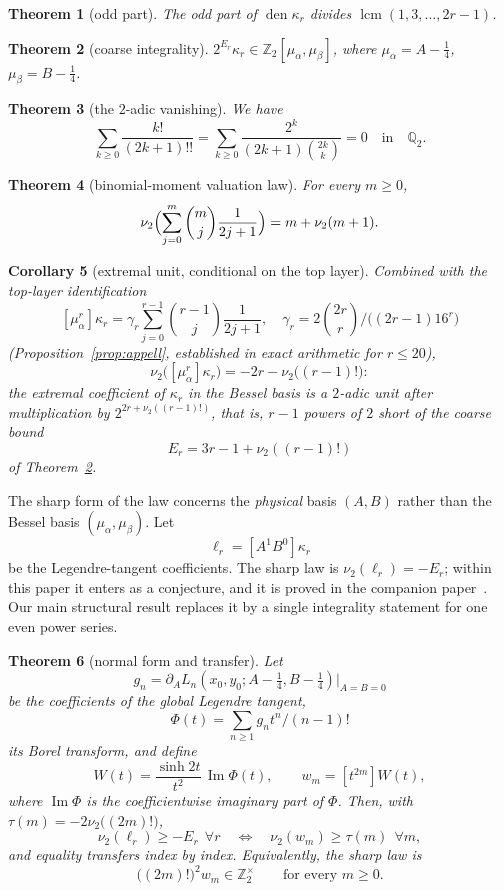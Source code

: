 \documentclass[12pt]{amsart}
\newtheorem{theorem}{Theorem}[section]
\newtheorem{corollary}[theorem]{Corollary}
\theoremstyle{definition}
\theoremstyle{remark}
\DeclareMathOperator{\den}{den}
\newcommand{\Zt}{\mathbb Z_2}
\newcommand{\Qt}{\mathbb Q_2}
\newcommand{\ma}{\mu_\alpha}
\newcommand{\mb}{\mu_\beta}
\begin{document}
\begin{theorem}[odd part]\label{thm:odd}
The odd part of $\den\kappa_r$ divides $\operatorname{lcm}(1,3,\dots,2r-1)$.
\end{theorem}

\begin{theorem}[coarse integrality]\label{thm:coarseintro}
$2^{E_r}\kappa_r\in\Zt[\ma,\mb]$, where $\ma=A-\frac14$, $\mb=B-\frac14$.
\end{theorem}

\begin{theorem}[the $2$-adic vanishing]\label{thm:vanishintro} We have
\[
\displaystyle\sum_{k\ge0}\frac{k!}{(2k+1)!!} =\sum_{k\ge0}\frac{2^k}{(2k+1)\binom{2k}{k}}=0 \quad \text{in} \quad \Qt.
\]
\end{theorem}

\begin{theorem}[binomial-moment valuation law]\label{thm:extremalintro}
For every $m\ge0$,
\[
  \nu_2\Bigl(\sum_{j=0}^{m}\binom mj\frac1{2j+1}\Bigr)=m+\nu_2(m+1).
\]
\end{theorem}

\begin{corollary}[extremal unit, conditional on the top layer]\label{cor:extremalintro}
Combined with the top-layer identification
\[
[\ma^r]\kappa_r=\gamma_r\sum_{j=0}^{r-1}\binom{r-1}j\frac1{2j+1},
 \quad \gamma_r=2\binom{2r}r/\bigl((2r-1)16^r\bigr)
 \]
(Proposition~\ref{prop:appell}, established in exact arithmetic for
$r\le20$),
\[
\nu_2\bigl([\ma^r]\kappa_r\bigr)=-2r-\nu_2\bigl((r-1)!\bigr):
\]
the extremal coefficient of $\kappa_r$ in the Bessel basis is a $2$-adic unit after multiplication by $2^{2r+\nu_2((r-1)!)}$, that is, $r-1$ powers of $2$ short of the coarse bound 
\[
E_r=3r-1+\nu_2((r-1)!)
\]
of Theorem~\ref{thm:coarseintro}.
\end{corollary}

The sharp form of the law concerns the \emph{physical} basis $(A,B)$ rather than the Bessel basis $(\ma,\mb)$.  Let
\[
  \ell_r=[A^1B^0]\kappa_r
\]
be the Legendre-tangent coefficients.  The sharp law is $\nu_2(\ell_r)=-E_r$; within this paper it enters as a conjecture, and it is proved in the companion paper~\cite{Ultraspherical}.  Our main structural result replaces it by a single integrality statement for one even power series.

\begin{theorem}[normal form and transfer]\label{thm:transferintro}
Let
\[
g_n=\partial_AL_n(x_0,y_0;A-\tfrac14,B-\tfrac14)\big|_{A=B=0}
\]
be the coefficients of the global Legendre tangent,
\[
\Phi(t)=\sum_{n\ge1}g_nt^n/(n-1)!
\]
its Borel transform, and define
\[
  W(t)=\frac{\sinh 2t}{t^2}\,\operatorname{Im}\Phi(t),\qquad   w_m=[t^{2m}]W(t),
\]
where $\operatorname{Im}\Phi$ is the coefficientwise imaginary part of
$\Phi$.  Then, with $\tau(m)=-2\nu_2\bigl((2m)!\bigr)$,
\[
  \nu_2(\ell_r)\ge-E_r\ \ \forall r   \quad\Longleftrightarrow\quad   \nu_2(w_m)\ge\tau(m)\ \ \forall m ,
\]
and equality transfers index by index.  Equivalently, the sharp law is
\[
  \bigl((2m)!\bigr)^2w_m\in\Zt^\times\qquad\text{for every }m\ge0 .
\]
\end{theorem}
\end{document}
